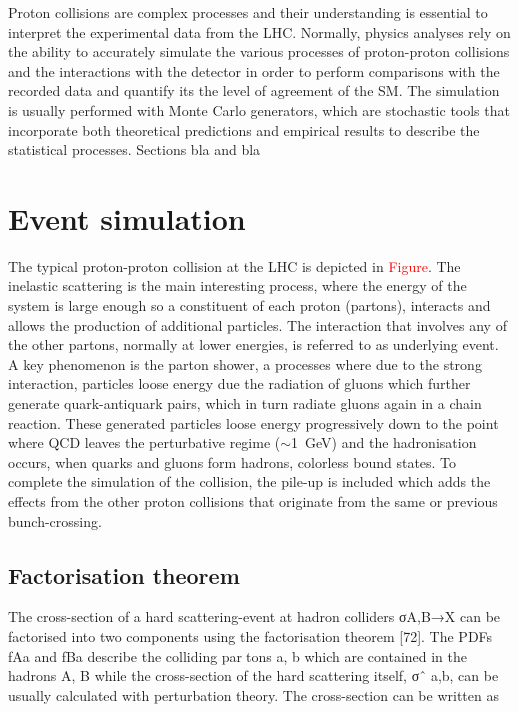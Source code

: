 Proton collisions are complex processes and their understanding is essential to interpret the experimental data from the LHC. Normally, physics analyses rely on the ability to accurately simulate the various processes of proton-proton collisions and the interactions with the detector in order to perform comparisons with the recorded data and quantify its the level of agreement of the SM. The simulation is usually performed with Monte Carlo generators, which are stochastic tools that incorporate both theoretical predictions and empirical results to describe the statistical processes.
Sections bla and bla 

\section{Event simulation}

The typical proton-proton collision at the LHC is depicted in \textcolor{red}{Figure}. The inelastic scattering is the main interesting process, where the energy of the system is large enough so a constituent of each proton (partons), interacts and allows the production of additional particles. The interaction that involves any of the other partons, normally at lower energies, is referred to as underlying event. A key phenomenon is the parton shower, a processes where due to the strong interaction, particles loose energy due the radiation of gluons which further generate quark-antiquark pairs, which in turn radiate gluons again in a chain reaction. These generated particles loose energy progressively down to the point where QCD leaves the perturbative regime ($\sim$1~GeV) and the hadronisation occurs, when quarks and gluons form hadrons, colorless bound states. To complete the simulation of the collision, the pile-up is included which adds the effects from the other proton collisions that originate from the same or previous bunch-crossing.  

\subsection{Factorisation theorem}

The cross-section of a hard scattering-event at hadron colliders σA,B→X can be factorised into two %
components using the factorisation theorem [72]. The PDFs fAa and fBa describe the colliding partons a, b which are contained in the hadrons A, B while the cross-section of the hard scattering itself,
σˆ a,b, can be usually calculated with perturbation theory. The cross-section can be written as


